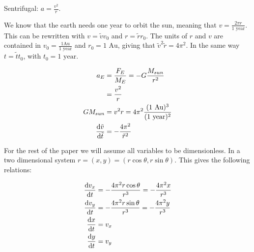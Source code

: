 
Sentrifugal: $ a = \frac{v^2}{r} $. 

We know that the earth needs one year to orbit the sun, meaning that $ v = \frac{2\pi r}{\text{1 year}} $. This can be rewritten with $ v = \tilde{v}v_0 $ and $ r = \tilde{r}r_0 $. The units of $ r $ and $ v $ are contained in  $ v_0 = \frac{1 \text{Au}}{1 \text{ year}} $ and $ r_0=1\text{ Au} $, giving that $ \tilde{v}^2\tilde{r} = 4\pi^2 $. In the same way $ t = \tilde{t}t_0 $, with $ t_0 = 1 \text{ year} $. 


\begin{align}
	a_E &= \frac{F_E}{M_E}= - G\frac{M_{sun}}{r^2}\\
	&= \frac{v^2}{r}\\
	GM_{sun}&= v^2 r = 4\pi^2 \frac{(\text{1 Au})^3}{(\text{1 year})^2}\\
	\dv{\tilde{v}}{\tilde{t}} &=- \frac{4\pi^2}{\tilde{r}^2} \label{eq:}
\end{align}

For the rest of the paper we will assume all variables to be dimensionless. 
In a two dimensional system $ r = (x,y) = (r\cos\theta, r\sin\theta) $. This gives the following relations:

\begin{align}
	\dv{{v}_x}{{t}} &=- \frac{4\pi^2r\cos\theta}{{r}^3}  =- \frac{4\pi^2x}{{r}^3} \\
		\dv{{v}_y}{{t}} &=- \frac{4\pi^2r\sin\theta}{{r}^3}  = -\frac{4\pi^2y}{{r}^3}\\
		\dv{x}{t} &= v_x\\
				\dv{y}{t} &= v_y\\
\end{align}